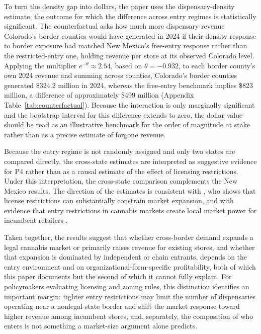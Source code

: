 \documentclass[english,12pt]{article}
\begin{document}
To turn the density gap into dollars, the paper uses the dispensary-density estimate, the outcome for which the difference across entry regimes is statistically significant. The counterfactual asks how much more dispensary revenue Colorado's border counties would have generated in 2024 if their density response to border exposure had matched New Mexico's free-entry response rather than the restricted-entry one, holding revenue per store at its observed Colorado level. Applying the multiplier $e^{-\theta}\approx2.54$, based on $\theta=-0.932$, to each border county's own 2024 revenue and summing across counties, Colorado's border counties generated \$324.2 million in 2024, whereas the free-entry benchmark implies \$823 million, a difference of approximately \$499 million (Appendix Table~\ref{tab:counterfactual}). Because the interaction is only marginally significant and the bootstrap interval for this difference extends to zero, the dollar value should be read as an illustrative benchmark for the order of magnitude at stake rather than as a precise estimate of forgone revenue.

Because the entry regime is not randomly assigned and only two states are compared directly, the cross-state estimates are interpreted as suggestive evidence for P4 rather than as a causal estimate of the effect of licensing restrictions. Under this interpretation, the cross-state comparison complements the New Mexico results. The direction of the estimates is consistent with \citet{thomas2019license}, who shows that license restrictions can substantially constrain market expansion, and with evidence that entry restrictions in cannabis markets create local market power for incumbent retailers \citep{HollenbeckUetake2021}.

Taken together, the results suggest that whether cross-border demand expands a legal cannabis market or primarily raises revenue for existing stores, and whether that expansion is dominated by independent or chain entrants, depends on the entry environment and on organizational-form-specific profitability, both of which this paper documents but the second of which it cannot fully explain. For policymakers evaluating licensing and zoning rules, this distinction identifies an important margin: tighter entry restrictions may limit the number of dispensaries operating near a nonlegal-state border and shift the market response toward higher revenue among incumbent stores, and, separately, the composition of who enters is not something a market-size argument alone predicts.
\end{document}
